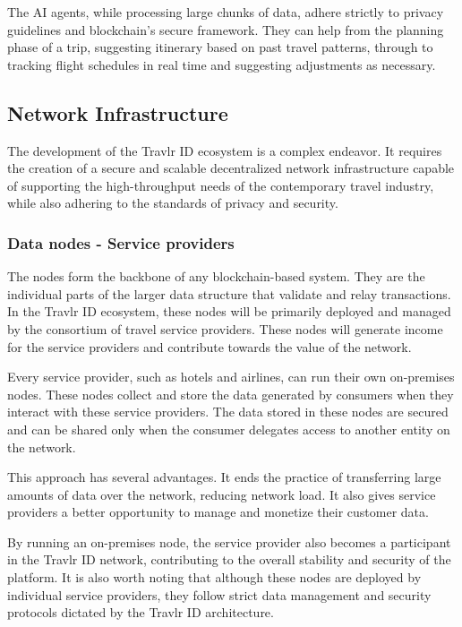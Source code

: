 \documentclass{article}
\begin{document}
The AI agents, while processing large chunks of data, adhere strictly to privacy guidelines and blockchain's secure framework. They can help from the planning phase of a trip, suggesting itinerary based on past travel patterns, through to tracking flight schedules in real time and suggesting adjustments as necessary. 

\subsection{Network Infrastructure}

The development of the Travlr ID ecosystem is a complex endeavor. It requires the creation of a secure and scalable decentralized network infrastructure capable of supporting the high-throughput needs of the contemporary travel industry, while also adhering to the standards of privacy and security.

\subsubsection{Data nodes - Service providers}

The nodes form the backbone of any blockchain-based system. They are the individual parts of the larger data structure that validate and relay transactions. In the Travlr ID ecosystem, these nodes will be primarily deployed and managed by the consortium of travel service providers. These nodes will generate income for the service providers and contribute towards the value of the network. 

Every service provider, such as hotels and airlines, can run their own on-premises nodes. These nodes collect and store the data generated by consumers when they interact with these service providers. The data stored in these nodes are secured and can be shared only when the consumer delegates access to another entity on the network.

This approach has several advantages. It ends the practice of transferring large amounts of data over the network, reducing network load. It also gives service providers a better opportunity to manage and monetize their customer data. 

By running an on-premises node, the service provider also becomes a participant in the Travlr ID network, contributing to the overall stability and security of the platform. It is also worth noting that although these nodes are deployed by individual service providers, they follow strict data management and security protocols dictated by the Travlr ID architecture.
\end{document}

